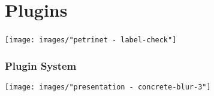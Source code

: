 





\section*{Plugins}


\begin{frame}
  \frametitle{}
  \centering
  \hspace{-1cm}
  \texttt{[image: images/"petrinet - label-check"]}
\end{frame}

\begin{frame}
  \frametitle{Plugin System}
  \hspace{-1cm}
  \texttt{[image: images/"presentation - concrete-blur-3"]}
\end{frame}

